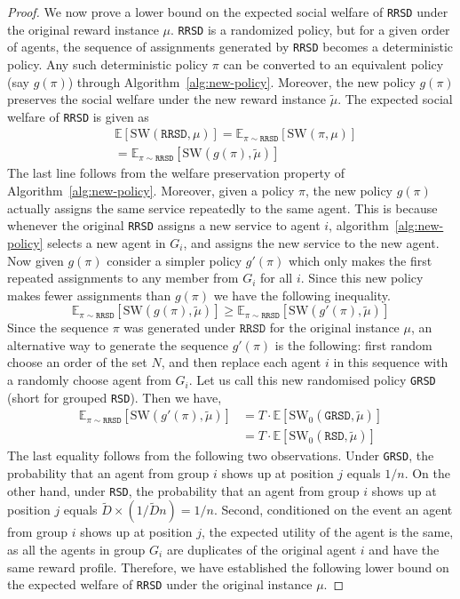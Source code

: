 \documentclass[letterpaper,11pt]{article}
\newcommand{\E}{\mathbb{E}}
\newcommand{\SW}{\textrm{SW}}
\begin{document}
\begin{proof}
     
       We now prove a lower bound on the expected social welfare of \texttt{RRSD} under the original reward instance $\mu$.  \texttt{RRSD} is a randomized policy, but for a given order of agents, the sequence of assignments generated by \texttt{RRSD} becomes a deterministic policy. Any such deterministic policy $\pi$ can be converted to an equivalent policy (say $g(\pi)$) through Algorithm~\ref{alg:new-policy}. Moreover, the new policy $g(\pi)$ preserves the social welfare under the new reward instance $\tilde{\mu}$. The expected social welfare of \texttt{RRSD} is given as 
       \begin{align*}
       &\E[\SW(\texttt{RRSD}, \mu)] = \E_{\pi \sim \texttt{RRSD}}[\SW(\pi, \mu)] \\&= \E_{\pi \sim \texttt{RRSD}}[\SW(g(\pi), \tilde{\mu})]
       \end{align*}
       The last line follows from the welfare preservation property of Algorithm~\ref{alg:new-policy}. Moreover, given a policy $\pi$, the new policy $g(\pi)$ actually assigns the same service repeatedly to the same agent. This is because whenever the original \texttt{RRSD} assigns a new service to agent $i$, algorithm~\ref{alg:new-policy} selects a new agent in $G_i$, and assigns the new service to the new agent. Now given $g(\pi)$ consider a simpler policy $g'(\pi)$ which only makes the first repeated assignments to any member from $G_i$ for all $i$. Since this new policy makes fewer assignments than $g(\pi)$ we have the following inequality.
       $$
       \E_{\pi \sim \texttt{RRSD}}[\SW(g(\pi), \tilde{\mu})] \ge \E_{\pi \sim \texttt{RRSD}}[\SW(g'(\pi), \tilde{\mu})]
       $$
       Since the sequence $\pi$ was generated under $\texttt{RRSD}$ for the original instance $\mu$, an alternative way to generate the sequence $g'(\pi)$ is the following: first random choose an order of the set $N$, and then replace each agent $i$ in this sequence with a randomly choose agent from $G_i$. Let us call this new randomised policy \texttt{GRSD} (short for grouped \texttt{RSD}). Then we have,
       \begin{align*}
       \E_{\pi \sim \texttt{RRSD}}[\SW(g'(\pi), \tilde{\mu})] &= T \cdot \E[\SW_0(\texttt{GRSD}, \tilde{\mu})] \\
       &= T \cdot \E[\SW_0(\texttt{RSD}, \tilde{\mu})] 
       \end{align*}
       The last equality follows from the following two observations. Under \texttt{GRSD}, the probability that an agent from group $i$ shows up at position $j$ equals $1/n$. On the other hand, under \texttt{RSD}, the probability that an agent from group $i$ shows up at position $j$ equals $\tilde{D} \times (1/\tilde{D} n) = 1/n$. Second, conditioned on the event an agent from group $i$ shows up at position $j$, the expected utility of the agent is the same, as all the agents in group $G_i$ are duplicates of the original agent $i$ and have the same reward profile. Therefore, we have established the following lower bound on the expected welfare of \texttt{RRSD} under the original instance $\mu$.

\end{proof}
\end{document}
